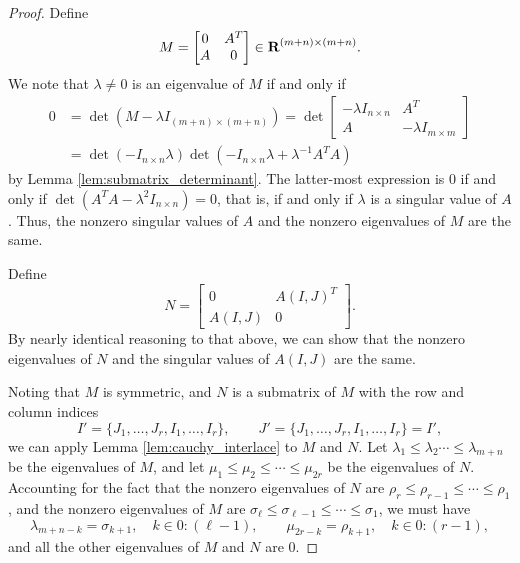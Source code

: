 \documentclass{article}
\begin{document}
	\begin{proof}
		Define
		\begin{equation}
			M = \left[\begin{matrix}
				0 & A^T \\
				A & 0
			\end{matrix}\right] \in \textnormal{\bf R}^{(m+n)\times(m+n)}.
		\end{equation}
		We note that $\lambda\ne 0$ is an eigenvalue of $M$ if and only if
		\begin{align}
			0 &= \det(M - \lambda I_{(m+n)\times(m+n)}) = \det\left[\begin{matrix}
				-\lambda I_{n\times n} & A^T \\
				A & -\lambda I_{m\times m}
			\end{matrix}\right] \\
			&= \det(-I_{n\times n}\lambda)\det(-I_{n\times n}\lambda + \lambda^{-1}A^TA)
		\end{align}
		by Lemma \ref{lem:submatrix_determinant}. The latter-most expression is 0 if and only if $\det(A^TA - \lambda^2I_{n\times n}) = 0$, that is, if and only if $\lambda$ is a singular value of $A$. Thus, the nonzero singular values of $A$ and the nonzero eigenvalues of $M$ are the same.
		
		Define
		\begin{equation}
			N = \left[\begin{matrix}
				0 & A(I,J)^T \\
				A(I,J) & 0
			\end{matrix}\right].
		\end{equation}
		By nearly identical reasoning to that above, we can show that the nonzero eigenvalues of $N$ and the singular values of $A(I,J)$ are the same.
		
		Noting that $M$ is symmetric, and $N$ is a submatrix of $M$ with the row and column indices
		\begin{equation}
			I' = \{J_1, \dots, J_r, I_1,\dots,I_r\}, \qquad J' = \{J_1, \dots, J_r, I_1,\dots,I_r\} = I',
		\end{equation}
		we can apply Lemma \ref{lem:cauchy_interlace} to $M$ and $N$. Let $\lambda_1 \le \lambda_2\cdots \le \lambda_{m+n}$ be the eigenvalues of $M$, and let $\mu_1\le \mu_2\le\cdots\le \mu_{2r}$ be the eigenvalues of $N$. Accounting for the fact that the nonzero eigenvalues of $N$ are $\rho_r \le \rho_{r-1} \le \cdots \le \rho_1$, and the nonzero eigenvalues of $M$ are $\sigma_\ell \le \sigma_{\ell-1} \le \cdots \le \sigma_1$, we must have
		\begin{equation}
			\lambda_{m+n-k} = \sigma_{k+1}, \quad k \in 0:(\ell -1), \qquad \mu_{2r-k} = \rho_{k+1}, \quad k \in 0:(r-1),
		\end{equation}
		and all the other eigenvalues of $M$ and $N$ are 0.
		

\end{proof}
\end{document}
